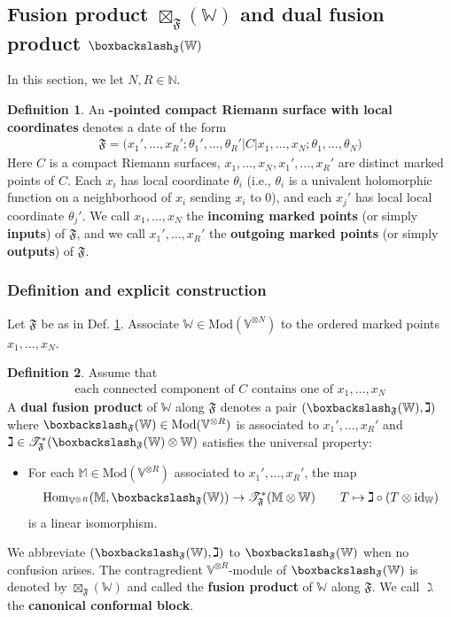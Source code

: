 \documentclass[11pt,b5paper,notitlepage]{article}
\theoremstyle{definition}
\newtheorem{df}{Definition}[section]
\theoremstyle{plain}
\newcommand{\fk}{\mathfrak}
\newcommand{\Hom}{\mathrm{Hom}}
\newcommand{\scr}{\mathscr}
\newcommand{\Vbb}{\mathbb V}
\newcommand{\Wbb}{\mathbb W}
\newcommand{\Mbb}{\mathbb M}
\newcommand{\Nbb}{\mathbb N}
\newcommand{\<}{\left\langle}
\renewcommand{\>}{\right\rangle}
\newcommand{\ST}{\mathscr{T}}
\newcommand{\bbs}{\boxbackslash}
\newcommand{\Mod}{\mathrm{Mod}}
\newcommand{\id}{\mathrm{id}}
\newcommand{\ff}{\mathfrak{F}}
\numberwithin{equation}{section}
\begin{document}
\subsection{Fusion product $\boxtimes_\ff(\Wbb)$ and dual fusion product $\bbs_\ff(\Wbb)$}

In this section, we let $N,R\in\Nbb$.

\begin{df}\label{lb12}
An \textbf{-pointed compact Riemann surface with local coordinates} denotes a date of the form
\begin{align*}
\fk F=\big(x_1',\dots,x_R'; \theta_1',\dots,\theta_R'\big|C\big|x_1,\dots,x_N;\theta_1,\dots,\theta_N\big)
\end{align*}
Here $C$ is a compact Riemann surfaces, $x_1,\dots,x_N,x_1',\dots,x_R'$ are distinct marked points of $C$. Each $x_i$ has local coordinate $\theta_i$ (i.e., $\theta_i$ is a univalent holomorphic function on a neighborhood of $x_i$ sending $x_i$ to $0$), and each $x_j'$ has local local coordinate $\theta_j'$. We call $x_1,\dots,x_N$ the \textbf{incoming marked points} (or simply \textbf{inputs}) of $\fk F$, and we call $x_1',\dots,x_R'$ the \textbf{outgoing marked points} (or simply \textbf{outputs}) of $\fk F$.
\end{df}


\subsubsection{Definition and explicit construction}

Let $\ff$ be as in Def. \ref{lb12}. Associate $\Wbb\in\Mod(\Vbb^{\otimes N})$ to the ordered marked points $x_1,\dots,x_N$. 

\begin{df}\label{lb13}
Assume that
\begin{align}\label{eq30}
\text{each connected component of $C$ contains one of $x_1,\dots,x_N$}
\end{align}
A \textbf{dual fusion product} of $\Wbb$ along $\fk F$ denotes a pair $(\bbs_\fk F(\Wbb),\gimel)$ where $\bbs_\fk F(\Wbb)\in\Mod(\Vbb^{\otimes R})$ is associated to $x_1',\dots,x_R'$ and  $\gimel\in\ST_\fk F^*(\bbs_\fk F(\Wbb)\otimes\Wbb)$ satisfies the universal property:
\begin{itemize}
\item For each $\Mbb\in\Mod(\Vbb^{\otimes R})$ associated to $x_1',\dots,x_R'$, the map
\begin{align}\label{eq31}
\Hom_{\Vbb^{\otimes R}}(\Mbb,\bbs_\fk F(\Wbb))\rightarrow \scr T_\fk F^*(\Mbb\otimes\Wbb)\qquad T\mapsto \gimel\circ(T\otimes\id_\Wbb)
\end{align}
is a linear isomorphism.
\end{itemize}
We abbreviate $(\bbs_\fk F(\Wbb),\gimel)$ to $\bbs_\fk F(\Wbb)$ when no confusion arises. The contragredient $\Vbb^{\otimes R}$-module of $\bbs_\ff(\Wbb)$ is denoted by $\boxtimes_\ff(\Wbb)$ and called the \textbf{fusion product} of $\Wbb$ along $\ff$. We call $\gimel$ the \textbf{canonical conformal block}.
\end{df}
\end{document}
